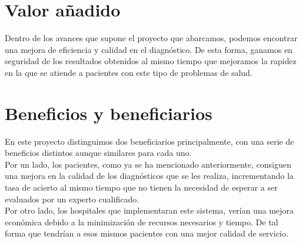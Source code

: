 \section{Valor añadido}

Dentro de los avances que supone el proyecto que abarcamos, podemos encontrar una mejora de eficiencia y calidad en el diagnóstico. De esta forma, ganamos en seguridad de los resultados obtenidos al mismo tiempo que mejoramos la rapidez en la que se atiende a pacientes con este tipo de problemas de salud.

\section{Beneficios y beneficiarios}

En este proyecto distinguimos dos beneficiarios principalmente, con una serie de beneficios distintos aunque similares para cada uno. \\

Por un lado, los pacientes, como ya se ha mencionado anteriormente, consiguen una mejora en la calidad de los diagnósticos que se les realiza, incrementando la tasa de acierto al mismo tiempo que no tienen la necesidad de esperar a ser evaluados por un experto cualificado. \\

Por otro lado, los hospitales que implementaran este sistema, verían una mejora económica debido a la minimización de recursos necesarios y tiempo. De tal forma que tendrían a esos mismos pacientes con una mejor calidad de servicio.


%
%


       
